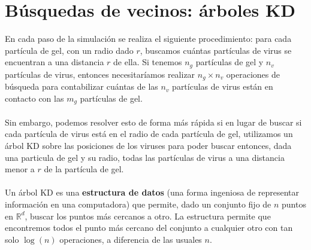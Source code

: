 \documentclass[11pt]{article}
\begin{document}
\section{Búsquedas de vecinos: árboles KD}
En cada paso de la simulación se realiza el siguiente procedimiento: para cada partícula de gel, con un radio dado $r$, buscamos cuántas partículas de virus se encuentran a una distancia $r$ de ella. Si tenemos $n_g$ partículas de gel y $n_v$ partículas de virus, entonces necesitaríamos realizar $n_g \times n_v$ operaciones de búsqueda para contabilizar cuántas de las $n_v$ partículas de virus están en contacto con las $m_g$ partículas de gel. 
\\
\\Sin embargo, podemos resolver esto de forma más rápida si en lugar de buscar si cada partícula de virus está en el radio de cada partícula de gel, utilizamos un árbol KD \cite{kdtrees} sobre las posiciones de los viruses para poder buscar entonces, dada una particula de gel y su radio, todas las partículas de virus a una distancia menor a $r$ de la partícula de gel.
\\
\\Un árbol KD es una \textbf{estructura de datos} (una forma ingeniosa de representar información en una computadora) que permite, dado un conjunto fijo de $n$ puntos en $\mathbb{R}^d$, buscar los puntos más cercanos a otro. La estructura permite que encontremos todos el punto más cercano del conjunto a cualquier otro con tan solo $ \log(n)$ operaciones, a diferencia de las usuales $n$.
\end{document}
